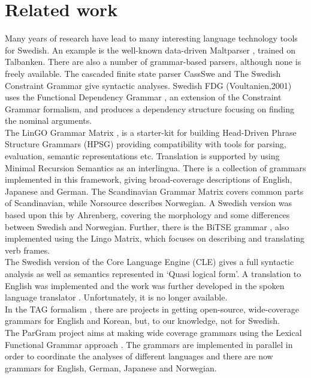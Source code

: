 \documentclass[10pt, a4paper]{article}
\begin{document}
\section{Related work}
Many years of research have lead to many interesting language
technology tools for Swedish.
An example is the well-known data-driven Maltparser \cite{malt},
trained on Talbanken. 
There are also a number of grammar-based parsers, although none is freely available.
The cascaded finite state parser CassSwe \cite{casswe} and
The Swedish Constraint Grammar \cite{birn}
give syntactic analyses. 
Swedish FDG (Voultanien,2001) uses the Functional Dependency Grammar
\cite{fdg},
an extension of the Constraint Grammar
formalism, and produces a dependency structure focusing on finding the nominal
arguments. \\
The LinGO Grammar Matrix \cite{matrix}, is a starter-kit for building
Head-Driven Phrase Structure Grammars \cite{hpsg} (HPSG) providing
compatibility with tools for parsing, evaluation, semantic representations etc.
Translation is supported by using Minimal Recursion
Semantics \cite{mrs} as an interlingua. 
There is a collection of grammars implemented in this framework, giving broad-coverage
descriptions of 
English, Japanese and German. 
The Scandinavian Grammar Matrix \cite{scandmatrix} covers common parts of
Scandinavian, while Norsource \cite{norsource} describes Norwegian. A Swedish version
was based upon this by Ahrenberg, covering the morphology and some
differences between Swedish and Norwegian. Further, there is the BiTSE 
grammar \cite{stymne}, also implemented using the Lingo Matrix,
which focuses on describing and translating verb frames.\\ 
The Swedish version of the Core Language Engine (CLE) \cite{gamback}
gives a full syntactic analysis as well as semantics represented in `Quasi logical form'. A
translation to English  was implemented and the work was further developed in the spoken
language translator \cite{spoken}. Unfortunately, it is no longer available.\\
In the TAG formalism \cite{tag}, there are projects in getting open-source, wide-coverage grammars
for English and Korean, but, to our knowledge, not for Swedish.  \\
The ParGram \cite{pargram} project aims at making wide coverage grammars using
the Lexical Functional Grammar approach \cite{lfg}.
The grammars are implemented in parallel in order to coordinate the analyses of
different languages and there are now grammars for English, German, Japanese and Norwegian. 
\end{document}
